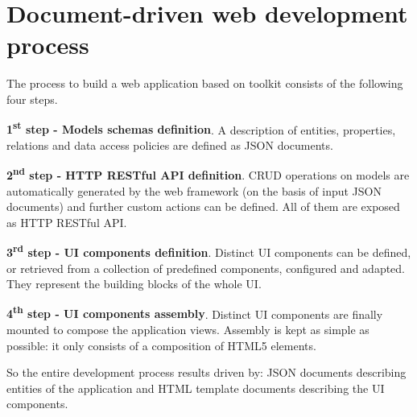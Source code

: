 \section{Document-driven web development process}\label{sec:dev-proc}

The process to build a web application based on  toolkit consists of the following four steps.

\textbf{1\textsuperscript{st} step - Models schemas definition}. A description of entities, properties, relations and data access policies are defined as JSON documents.

\textbf{2\textsuperscript{nd} step - HTTP RESTful API definition}. CRUD operations on models are automatically generated by the web framework (on the basis of input JSON documents) and further custom actions can be defined. All of them are exposed as HTTP RESTful API.

\textbf{3\textsuperscript{rd} step - UI components definition}. Distinct UI components can be defined, or retrieved from a collection of predefined components, configured and adapted. They represent the building blocks of the whole UI.

\textbf{4\textsuperscript{th} step - UI components assembly}. Distinct UI components are finally mounted to compose the application views. Assembly is kept as simple as possible: it only consists of a composition of HTML5 elements.

\vspace{0.2cm}

So the entire development process results driven by: JSON documents describing entities of the application and HTML template documents describing the UI components.



